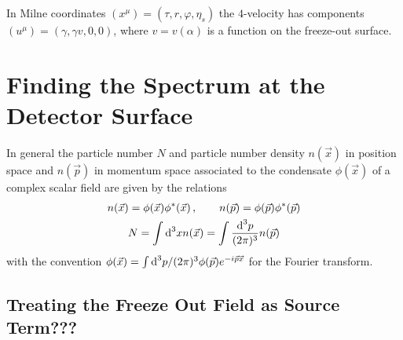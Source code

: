 In Milne coordinates $(x^\mu)=(\tau,r,\varphi,\eta_s)$ the $4$-velocity has components $(u^\mu)=(\gamma,\gamma v,0,0)$, where $v=v(\alpha)$ is a function on the freeze-out surface. 

\section{Finding the Spectrum at the Detector Surface}

In general the particle number $N$ and particle number density $n(\vec{x})$ in position space and $n(\vec{p})$ in momentum space associated to the condensate $\phi(\vec{x})$ of a complex scalar field are given by the relations
\begin{subequations}
    \begin{gather}
        n(\vec{x})=\phi(\vec{x})\phi^*(\vec{x})\,,\qquad n(\vec{p})=\phi(\vec{p})\phi^*(\vec{p})\\
        N=\int\text{d}^3xn(\vec{x})=\int\frac{\text{d}^3p}{(2\pi)^3}n(\vec{p})
    \end{gather}
\end{subequations}
with the convention $\phi(\vec{x})=\int\text{d}^3p/(2\pi)^3\phi(\vec{p})e^{-{i}\vec{p}\vec{x}}$ for the Fourier transform.



% 

\subsection{Treating the Freeze Out Field as Source Term???}

